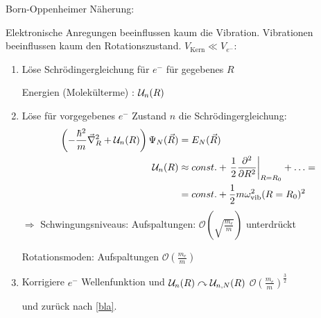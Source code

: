 	Born-Oppenheimer Näherung:
	
	Elektronische Anregungen beeinflussen kaum die Vibration. Vibrationen beeinflussen kaum den Rotationszustand. 
	$V_{\mathrm{Kern}} \ll V_{e^-}$:
	\begin{enumerate}[1.]
		\item Löse Schrödingergleichung für $e^-$ für gegebenes $R$
		
			Energien (Molekülterme) : $\mathcal{U}_n(R)$
		\item Löse für vorgegebenes $e^-$ Zustand $n$ die Schrödingergleichung: \label{bla}
				\begin{align*}
					\left( - \frac{\hbar^2}{m} \vec{\nabla}_R^2 + \mathcal{U}_n (R)
					\right)	
					\Psi_N (\vec{R}) &= E_N (\vec{R}) \\
					\mathcal{U}_n (R) &\approx const. + \left.\frac{1}{2} \frac{\partial^2}{\partial R^2}
					\right|_{R=R_0} + \ldots = \\
					&= const. + \frac{1}{2} m \omega_{\mathrm{vib}}^2 (R=R_0)^2 
				\end{align*}
			$\Rightarrow$ Schwingungsniveaus: Aufspaltungen: $\mathscr{O} \left(\sqrt{\frac{m_e}{m}}\right)$ unterdrückt
			
			Rotationsmoden: Aufspaltungen $\mathscr{O} \left(\frac{m_e}{m}\right)$
			
		\item Korrigiere $e^-$ Wellenfunktion und $\mathcal{U}_n(R) \curvearrowright \mathcal{U}_{n,N}(R)$ 
			 $\mathscr{O} \left(\frac{m_e}{m}\right)^{\frac{3}{2}}$ 
			 
			 und zurück nach \ref{bla}.
	\end{enumerate}
